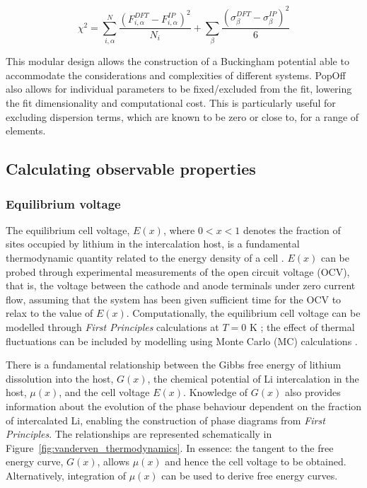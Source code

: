 \documentclass[../main.tex]{subfiles}
\begin{document}
\begin{equation}
    \chi^2 = \sum^{N}_{i,\alpha} \frac{(F^{DFT}_{i,\alpha} - F^{IP}_{i,\alpha})^2}{N_i} +  \sum_{\beta} \frac{(\sigma^{DFT}_{\beta} - \sigma^{IP}_{\beta})^2}{6}
\end{equation}

This modular design allows the construction of a Buckingham potential able to accommodate the considerations and complexities of different systems. PopOff also allows for individual parameters to be fixed/excluded from the fit, lowering the fit dimensionality and computational cost. This is particularly useful for excluding dispersion terms, which are known to be zero or close to, for a range of elements.\cite{Lee2013_lithium,fisher2008lithium}

\subsection{Calculating observable properties}
\subsubsection{Equilibrium voltage}
\label{sec:properties_equilibriumvoltage}
The equilibrium cell voltage, $E(x)$, where $0 < x < 1$ denotes the fraction of sites occupied by lithium in the intercalation host, is a fundamental thermodynamic quantity related to the energy density of a cell \cite{Urban2016,CEDER1999131,VanderVen2020}. $E(x)$ can be probed through experimental measurements of the open circuit voltage (OCV), that is, the voltage between the cathode and anode terminals under zero current flow, assuming that the system has been given sufficient time for the OCV to relax to the value of $E(x)$. Computationally, the equilibrium cell voltage can be modelled through \textit{First Principles} calculations at $T = 0$ K \cite{Urban2016,CEDER1999131,VanderVen2020}; the effect of thermal fluctuations can be included by modelling using Monte Carlo (MC) calculations \cite{mercer_influence_2017,Kim2001h}.

There is a fundamental relationship between the Gibbs free energy of lithium dissolution into the host, $G(x)$, the chemical potential of Li intercalation in the host, $\mu(x)$, and the cell voltage $E(x)$. Knowledge of $G(x)$ also provides information about the evolution of the phase behaviour dependent on the fraction of intercalated Li,\cite{CEDER1999131,persson2010,VanderVen2020,VanDerVen2000b} enabling the construction of phase diagrams from \textit{First Principles}. The relationships are represented schematically in Figure~\ref{fig:vanderven_thermodynamics}. In essence: the tangent to the free energy curve, $G(x)$, allows $\mu(x)$ and hence the cell voltage to be obtained. Alternatively, integration of $\mu(x)$ can be used to derive free energy curves.
\end{document}

